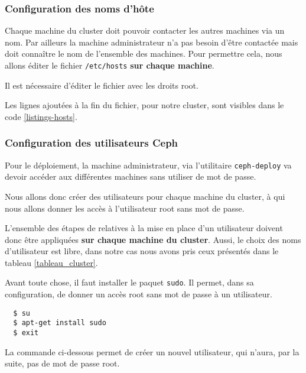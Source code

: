 \subsubsection{Configuration des noms d’hôte}

Chaque machine du cluster doit pouvoir contacter les autres machines via un nom. Par ailleurs la machine administrateur n'a pas besoin d'être contactée mais doit connaître le nom de l'ensemble des machines. Pour permettre cela, nous allons éditer le fichier \verb|/etc/hosts| \textbf{sur chaque machine}.

\begin{WarningBox}
Il est nécessaire d'éditer le fichier avec les droits root. 
\end{WarningBox}

Les lignes ajoutées à la fin du fichier, pour notre cluster, sont visibles dans le code \ref{listings-hosts}.

\vspace{3mm}


\subsubsection{Configuration des utilisateurs Ceph}

Pour le déploiement, la machine administrateur, via l'utilitaire \verb|ceph-deploy| va devoir accéder aux différentes machines sans utiliser de mot de passe. 

Nous allons donc créer des utilisateurs pour chaque machine du cluster, à qui nous allons donner les accès à l'utilisateur root sans mot de passe.

L'ensemble des étapes de relatives à la mise en place d'un utilisateur doivent donc être appliquées \textbf{sur chaque machine du cluster}. Aussi, le choix des noms d'utilisateur est libre, dans notre cas nous avons pris ceux présentés dans le tableau \ref{tableau_cluster}.

Avant toute chose, il faut installer le paquet \verb|sudo|. Il permet, dans sa configuration, de donner un accès root sans mot de passe à un utilisateur.

\vspace{3mm}
\begin{lstlisting}
  $ su
  $ apt-get install sudo
  $ exit
\end{lstlisting}

La commande ci-dessous permet de créer un nouvel utilisateur, qui n'aura, par la suite, pas de mot de passe root.

